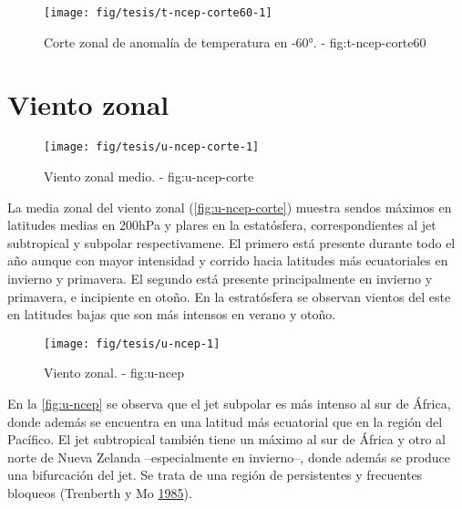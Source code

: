 \documentclass[spanish,a4paper]{book}
\begin{document}
\begin{figure}

{\centering \texttt{[image: fig/tesis/t-ncep-corte60-1]} 

}

\caption{Corte zonal de anomalía de temperatura en -60°. - fig:t-ncep-corte60}\label{fig:t-ncep-corte60}
\end{figure}

\section{Viento zonal}\label{viento-zonal}

\begin{figure}

{\centering \texttt{[image: fig/tesis/u-ncep-corte-1]} 

}

\caption{Viento zonal medio. - fig:u-ncep-corte}\label{fig:u-ncep-corte}
\end{figure}

La media zonal del viento zonal (\autoref{fig:u-ncep-corte}) muestra
sendos máximos en latitudes medias en 200hPa y plares en la estatósfera,
correspondientes al jet subtropical y subpolar respectivamene. El
primero está presente durante todo el año aunque con mayor intensidad y
corrido hacia latitudes más ecuatoriales en invierno y primavera. El
segundo está presente principalmente en invierno y primavera, e
incipiente en otoño. En la estratósfera se observan vientos del este en
latitudes bajas que son más intensos en verano y otoño.

\begin{landscape}\begin{figure}

{\centering \texttt{[image: fig/tesis/u-ncep-1]} 

}

\caption{Viento zonal. - fig:u-ncep}\label{fig:u-ncep}
\end{figure}
\end{landscape}

En la \autoref{fig:u-ncep} se observa que el jet subpolar es más intenso
al sur de África, donde además se encuentra en una latitud más
ecuatorial que en la región del Pacífico. El jet subtropical también
tiene un máximo al sur de África y otro al norte de Nueva Zelanda
--especialmente en invierno--, donde además se produce una bifurcación
del jet. Se trata de una región de persistentes y frecuentes bloqueos
(Trenberth y Mo \protect\hyperlink{ref-Trenberth1985}{1985}).
\end{document}
